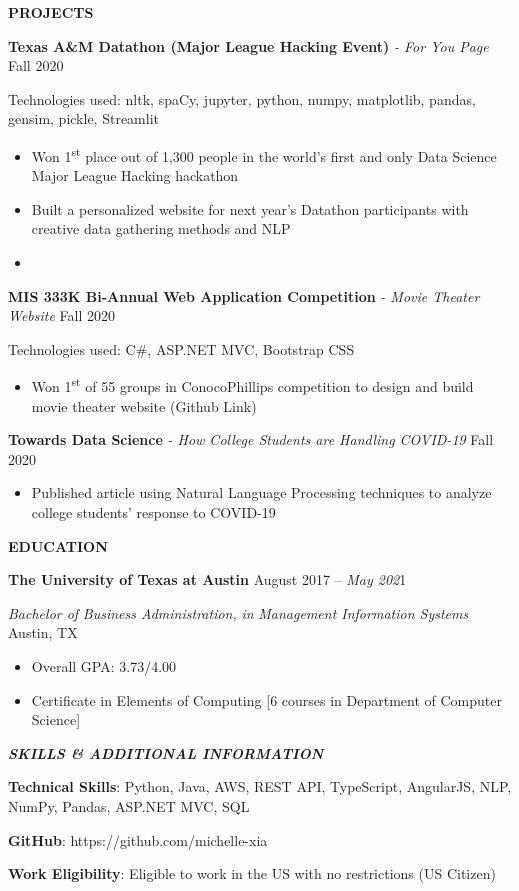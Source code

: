 \documentclass[
]{article}
\providecommand{\tightlist}{%
  \setlength{\itemsep}{0pt}\setlength{\parskip}{0pt}}
\begin{document}
\hfill\break

\textbf{PROJECTS}

\textbf{Texas A\&M Datathon (Major League Hacking Event)} \emph{- For
You Page}{ }Fall 2020

Technologies used: nltk, spaCy, jupyter, python, numpy, matplotlib,
pandas, gensim, pickle, Streamlit{~}

\begin{itemize}
\tightlist
\item
  Won 1\textsuperscript{st} place out of 1,300 people in the world's
  first and only Data Science Major League Hacking hackathon
\item
  Built a personalized website for next year's Datathon participants
  with creative data gathering methods and NLP
\item
\end{itemize}

\textbf{MIS 333K Bi-Annual Web Application Competition} \emph{- Movie
Theater Website}{\emph{{ }}}Fall 2020

Technologies used: C\#, ASP.NET MVC, Bootstrap CSS

\begin{itemize}
\tightlist
\item
  Won 1\textsuperscript{st} of 55 groups in ConocoPhillips competition
  to design and build movie theater website ({Github Link}){~}
\end{itemize}

\hfill\break

\textbf{Towards Data Science} \emph{- How College Students are Handling
COVID-19}{ }Fall 2020

\begin{itemize}
\tightlist
\item
  Published {article} using Natural Language Processing techniques to
  analyze college students' response to COVID-19
\end{itemize}

\hfill\break

\textbf{EDUCATION}

\textbf{The University of Texas at Austin}{\textbf{\emph{{ }}}}August
2017 -- {\emph{May 202}}1

{\emph{Bachelor of} }\emph{Business Administration,}{ \emph{in}
}\emph{Management Information Systems}{\emph{{ }}}Austin, TX

\begin{itemize}
\tightlist
\item
  Overall GPA: 3.73/4.00
\item
  Certificate in Elements of Computing {[}6 courses in Department of
  Computer Science{]}
\end{itemize}

\hfill\break

{\textbf{\emph{SKILLS \& ADDITIONAL INFORMATION}}}

\textbf{Technical Skills}: Python, Java, AWS, REST API, TypeScript,
AngularJS, NLP, NumPy, Pandas, ASP.NET MVC, SQL

{\textbf{GitHub}: }{https://github.com/michelle-xia}{{~}}

\textbf{Work Eligibility}: Eligible to work in the US with no
restrictions (US Citizen)
\end{document}
